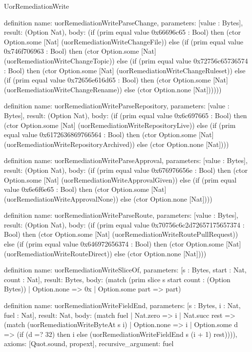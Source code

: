 \begin{lexlean}{UorRemediationWrite}
\begin{semanticmodule}
definition{
  name: uorRemediationWriteParseChange,
  parameters: [value : Bytes],
  result: (Option Nat),
  body: (if (prim equal value 0x66696c65 : Bool) then (ctor Option.some [Nat] (uorRemediationWriteChangeFile)) else (if (prim equal value 0x746f706963 : Bool) then (ctor Option.some [Nat] (uorRemediationWriteChangeTopic)) else (if (prim equal value 0x72756c65736574 : Bool) then (ctor Option.some [Nat] (uorRemediationWriteChangeRuleset)) else (if (prim equal value 0x72656e616d65 : Bool) then (ctor Option.some [Nat] (uorRemediationWriteChangeRename)) else (ctor Option.none [Nat])))))
}

definition{
  name: uorRemediationWriteParseRepository,
  parameters: [value : Bytes],
  result: (Option Nat),
  body: (if (prim equal value 0x6c697665 : Bool) then (ctor Option.some [Nat] (uorRemediationWriteRepositoryLive)) else (if (prim equal value 0x6172636869766564 : Bool) then (ctor Option.some [Nat] (uorRemediationWriteRepositoryArchived)) else (ctor Option.none [Nat])))
}

definition{
  name: uorRemediationWriteParseApproval,
  parameters: [value : Bytes],
  result: (Option Nat),
  body: (if (prim equal value 0x676976656e : Bool) then (ctor Option.some [Nat] (uorRemediationWriteApprovalGiven)) else (if (prim equal value 0x6e6f6e65 : Bool) then (ctor Option.some [Nat] (uorRemediationWriteApprovalNone)) else (ctor Option.none [Nat])))
}

definition{
  name: uorRemediationWriteParseRoute,
  parameters: [value : Bytes],
  result: (Option Nat),
  body: (if (prim equal value 0x70756c6c2d72657175657374 : Bool) then (ctor Option.some [Nat] (uorRemediationWriteRoutePullRequest)) else (if (prim equal value 0x646972656374 : Bool) then (ctor Option.some [Nat] (uorRemediationWriteRouteDirect)) else (ctor Option.none [Nat])))
}

definition{
  name: uorRemediationWriteSliceOf,
  parameters: [s : Bytes, start : Nat, count : Nat],
  result: Bytes,
  body: (match (prim slice s start count : (Option Bytes))
    | Option.none => 0x
    | Option.some part => part)
}

definition{
  name: uorRemediationWriteFieldEnd,
  parameters: [s : Bytes, i : Nat, fuel : Nat],
  result: Nat,
  body: (match fuel
    | Nat.zero => i
    | Nat.succ rest => (match (uorRemediationWriteByteAt s i)
      | Option.none => i
      | Option.some d => (if (d =? 32) then i else (uorRemediationWriteFieldEnd s (i + 1) rest)))),
  axioms: [Quot.sound, propext],
  recursive_argument: fuel
}


\end{semanticmodule}
\end{lexlean}
